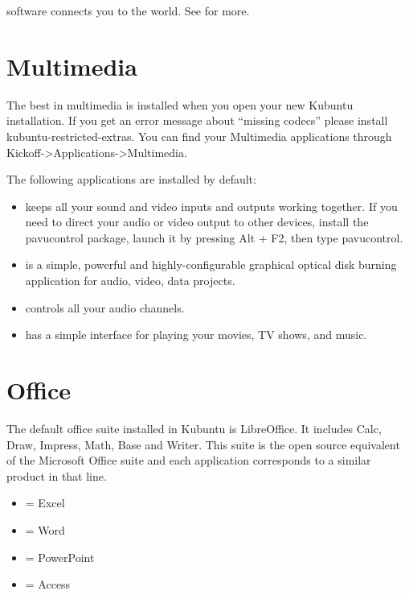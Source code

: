 \documentclass[letterpaper,10pt,english]{sphinxmanual}
\begin{document}
 software connects you to the world. See  for more.


\section{Multimedia}
\label{\detokenize{docs/software:multimedia}}
The best in multimedia is installed when you open your new Kubuntu installation. If you get an error message about “missing codecs” please install kubuntu-restricted-extras. You can find your Multimedia applications through Kickoff-\textgreater{}Applications-\textgreater{}Multimedia.

The following applications are installed by default:
\begin{itemize}
\item {} 
 keeps all your sound and video inputs and outputs working together. If you need to direct your audio or video output to other devices, install the pavucontrol package, launch it by pressing Alt + F2, then type pavucontrol.

\item {} 
 is a simple, powerful and highly-configurable graphical optical disk burning application for audio, video, data projects.

\item {} 
 controls all your audio channels.

\item {} 
 has a simple interface for playing your movies, TV shows, and music.

\end{itemize}


\section{Office}
\label{\detokenize{docs/software:office}}
The default office suite installed in Kubuntu is LibreOffice. It includes Calc, Draw, Impress, Math, Base and Writer. This suite is the open source equivalent of the Microsoft Office suite and each application corresponds to a similar product in that line.
\begin{itemize}
\item {} 
 = Excel

\item {} 
 = Word

\item {} 
 = PowerPoint

\item {} 
 = Access

\end{itemize}
\end{document}
